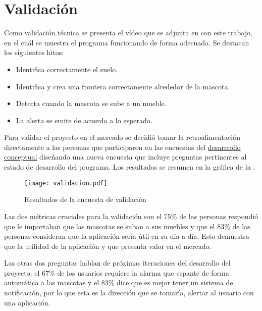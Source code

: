\section{Validación}

\label{sec:validacion}

Como validación técnica se presenta el vídeo que se adjunta en con este trabajo, en el cuál se muestra el programa funcionando de forma adecuada. Se destacan los siguientes hitos:

\begin{itemize}
    \item Identifica correctamente el suelo.
    \item Identifica y crea una frontera correctamente alrededor de la mascota.
    \item Detecta cuando la mascota se sube a un mueble.
    \item La alerta se emite de acuerdo a lo esperado.
\end{itemize}


Para validar el proyecto  en el mercado se decidió tomar la retroalimentación directamente a las personas que participaron en las encuestas del \hyperref[sec:desarrolloconceptual]{desarrrollo conceptual} diseñando una nueva encuesta que incluye preguntas pertinentes al estado de desarrollo del programa. Los resultados se resumen en la gráfica de la . 


\begin{figure}
    \centering
    \caption[Validación]{Resultados de la encuesta de validación}
    \label{fig:validacion}
    \texttt{[image: validacion.pdf]}
  \end{figure}

Las dos métricas cruciales para la validación son el 75\% de las personas respondió que le importaban que las mascotas se suban a sus muebles y que el 
83\% de las personas consideran que la aplicación sería útil en su día a día. Esto demuestra que la utilidad de la aplicación y que presenta valor en el mercado. 


Las otras dos preguntas hablan de próximas iteraciones del desarrollo del proyecto: el 67\% de los usuarios requiere la alarma que espante de forma automática a las mascotas y el 83\% dice que es mejor tener un sistema de notificación, por lo que esta es la dirección que se tomaría, alertar al usuario con una aplicación.